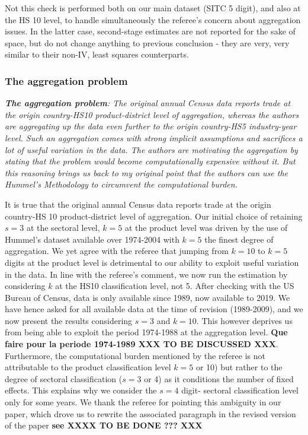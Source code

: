\documentclass[a4paper,12pt]{article}
\begin{document}
Not this check is performed both on our main dataset (SITC 5 digit), and also at the HS 10 level, to handle simultaneously the referee's concern about aggregation issues. In the latter case, second-stage estimates are not reported for the sake of space, but do not change anything to previous conclusion - they are very, very similar to their non-IV, least squares counterparts.


\subsubsection{The aggregation problem}

\textit{\textbf{The aggregation problem}: The original annual Census data reports
trade at the origin country-HS10 product-district level of aggregation,
whereas the authors are aggregating up the data even further to the origin
country-HS5 industry-year level. Such an aggregation comes with strong implicit assumptions and sacrifices a lot of useful variation in the data.
The authors are motivating the aggregation by stating that the problem
would become computationally expensive without it. But this reasoning
brings us back to my original point that the authors can use the Hummel's
Methodology to circumvent the computational burden.}

It is true that the original annual Census data reports trade at the origin country-HS 10 product-district level of aggregation. Our initial choice of retaining $s=3$ at the sectoral level, $k=5$ at the product level was driven by the use of Hummel's dataset available over 1974-2004 with $k=5$ the finest degree of aggregation. We yet agree with the referee that jumping from $k=10$ to $k=5$ digits at the product level is detrimental to our ability to exploit useful variation in the data. In line with the referee's comment, we now run the estimation by considering $k$ at the HS10 classification level, not 5. After checking with the US Bureau of Census, data is only available since 1989, now available to 2019. We have hence asked for all available data at the time of revision (1989-2009), and we now present the results considering $s=3$ and $k=10$. This however deprives us from being able to exploit the period 1974-1988 at the aggregation level. \textbf{Que faire pour la periode 1974-1989 XXX TO BE DISCUSSED XXX}. Furthermore, the computational burden mentioned by the referee is not attributable to the product classification level $k=5$ or 10) but rather to the degree of sectoral classification ($s=3$ or 4) as it conditions the number of fixed effects. This explains why we consider the $s=4$ digit- sectoral classification level only for some years. We thank the referee for pointing this ambiguity in our paper, which drove us to rewrite the associated paragraph in the revised version of the paper \textbf{see XXXX TO BE DONE ??? XXX}
\end{document}
